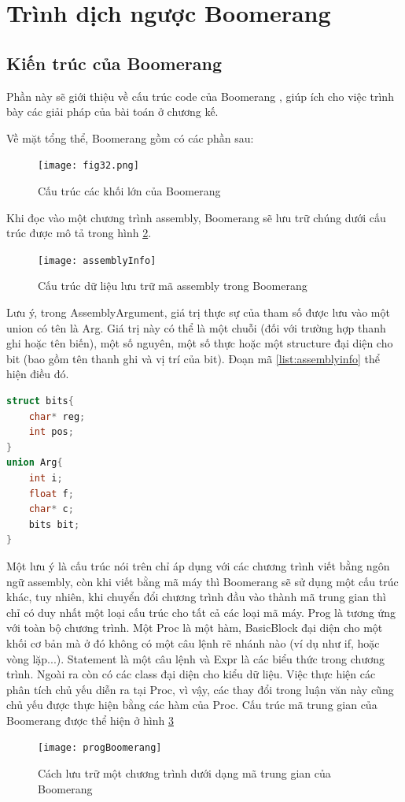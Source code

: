\section{Trình dịch ngược Boomerang}
\subsection{Kiến trúc của Boomerang}
Phần này sẽ giới thiệu về cấu trúc code của Boomerang \cite{boomeranghomepage}, giúp ích cho việc trình bày các giải pháp của bài toán ở chương kế.

Về mặt tổng thể, Boomerang gồm có các phần sau:
\begin{figure}[h]
	\centering
	\texttt{[image: fig32.png]}
	\caption{Cấu trúc các khối lớn của Boomerang}
	\label{fig:boomstruct}
\end{figure}

Khi đọc vào một chương trình assembly, Boomerang sẽ lưu trữ chúng dưới cấu trúc được mô tả trong hình \ref{fig:assemblyinfo}.

\begin{figure}[h!]
	\centering
	\texttt{[image: assemblyInfo]}
	\caption{Cấu trúc dữ liệu lưu trữ mã assembly trong Boomerang}
	\label{fig:assemblyinfo}
\end{figure}

Lưu ý, trong AssemblyArgument, giá trị thực sự của tham số được lưu vào một union có tên là Arg. Giá trị này có thể là một chuỗi (đối với trường hợp thanh ghi hoặc tên biến), một số nguyên, một số thực hoặc một structure đại diện cho bit (bao gồm tên thanh ghi và vị trí của bit). Đoạn mã \ref{list:assemblyinfo} thể hiện điều đó.
\begin{lstlisting}[caption={Đoạn mã mô tả cách biểu diễn giá trị của tham số trong Boomerang}, label={list:assemblyinfo}, language=c++]
struct bits{
	char* reg;
	int pos;
}
union Arg{
	int i;
	float f;
	char* c;
	bits bit;
}
\end{lstlisting}

Một lưu ý là cấu trúc nói trên chỉ áp dụng với các chương trình viết bằng ngôn ngữ assembly, còn khi viết bằng mã máy thì Boomerang sẽ sử dụng một cấu trúc khác, tuy nhiên, khi chuyển đổi chương trình đầu vào thành mã trung gian thì chỉ có duy nhất một loại cấu trúc cho tất cả các loại mã máy. Prog là tương ứng với toàn bộ chương trình. Một Proc là một hàm, BasicBlock đại diện cho một khối cơ bản mà ở đó không có một câu lệnh rẽ nhánh nào (ví dụ như if, hoặc vòng lặp...). Statement là một câu lệnh và Expr là các biểu thức trong chương trình. Ngoài ra còn có các class đại diện cho kiểu dữ liệu. Việc thực hiện các phân tích chủ yếu diễn ra tại Proc, vì vậy, các thay đổi trong luận văn này cũng chủ yếu được thực hiện bằng các hàm của Proc. Cấu trúc mã trung gian của Boomerang được thể hiện ở hình \ref{fig:progboomerang}\\
\begin{figure}
	\centering
	\texttt{[image: progBoomerang]}
	\caption{Cách lưu trữ một chương trình dưới dạng mã trung gian của Boomerang}
	\label{fig:progboomerang}
\end{figure}


